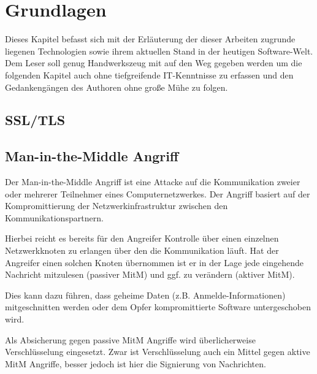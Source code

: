 \section{Grundlagen}

Dieses Kapitel befasst sich mit der Erläuterung der dieser Arbeiten zugrunde liegenen Technologien sowie ihrem aktuellen Stand in der heutigen Software-Welt.
Dem Leser soll genug Handwerkszeug mit auf den Weg gegeben werden um die folgenden Kapitel auch ohne tiefgreifende IT-Kenntnisse zu erfassen und den Gedankengängen des Authoren ohne große Mühe zu folgen.

\subsection{SSL/TLS}
\label{subsec:ssl}


\subsection{Man-in-the-Middle Angriff}

Der Man-in-the-Middle Angriff ist eine Attacke auf die Kommunikation zweier oder mehrerer Teilnehmer eines Computernetzwerkes. Der Angriff basiert auf der Kompromittierung der Netzwerkinfrastruktur zwischen den Kommunikationspartnern.

Hierbei reicht es bereits für den Angreifer Kontrolle über einen einzelnen Netzwerkknoten zu erlangen über den die Kommunikation läuft.
Hat der Angreifer einen solchen Knoten übernommen ist er in der Lage jede eingehende Nachricht mitzulesen (passiver MitM) und ggf. zu verändern (aktiver MitM).

Dies kann dazu führen, dass geheime Daten (z.B. Anmelde-Informationen) mitgeschnitten werden oder dem Opfer kompromittierte  Software untergeschoben wird.

Als Absicherung gegen passive MitM Angriffe wird überlicherweise Verschlüsselung eingesetzt. Zwar ist Verschlüsselung auch ein Mittel gegen aktive MitM Angriffe, besser jedoch ist hier die Signierung von Nachrichten.


